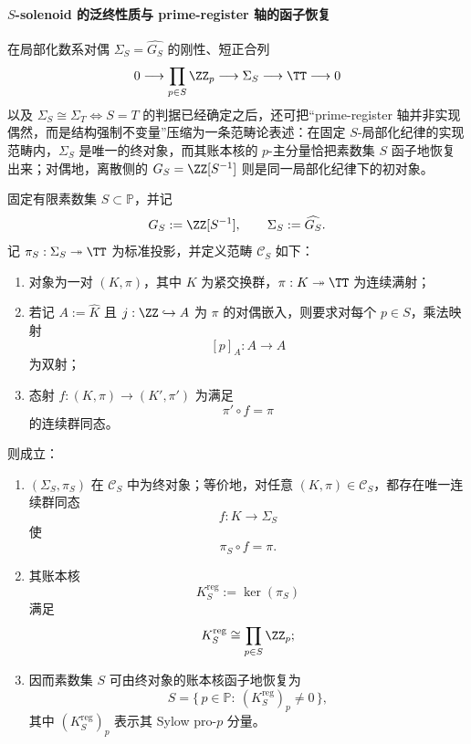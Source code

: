 \paragraph{\texorpdfstring{$S$}{S}-solenoid 的泛终性质与 prime-register 轴的函子恢复}
在局部化数系对偶 \(\Sigma_S=\widehat{G_S}\) 的刚性、短正合列
\[
0\longrightarrow \prod_{p\in S}\ZZ_p\longrightarrow \Sigma_S\longrightarrow \TT\longrightarrow 0
\]
以及 \(\Sigma_S\cong \Sigma_T\iff S=T\) 的判据已经确定之后，还可把“prime-register 轴并非实现偶然，而是结构强制不变量”压缩为一条范畴论表述：在固定 \(S\)-局部化纪律的实现范畴内，\(\Sigma_S\) 是唯一的终对象，而其账本核的 \(p\)-主分量恰把素数集 \(S\) 函子地恢复出来；对偶地，离散侧的 \(G_S=\ZZ[S^{-1}]\) 则是同一局部化纪律下的初对象。

\begin{theorem}\label{thm:xi-time-part56-solenoid-terminal-prime-register-recovery}
固定有限素数集 \(S\subset\mathbb P\)，并记
\[
G_S:=\ZZ[S^{-1}],
\qquad
\Sigma_S:=\widehat{G_S}.
\]
记 \(\pi_S:\Sigma_S\twoheadrightarrow\TT\) 为标准投影，并定义范畴 \(\mathcal C_S\) 如下：
\begin{enumerate}
  \item 对象为一对 \((K,\pi)\)，其中 \(K\) 为紧交换群，\(\pi:K\twoheadrightarrow\TT\) 为连续满射；
  \item 若记 \(A:=\widehat K\) 且 \(j:\ZZ\hookrightarrow A\) 为 \(\pi\) 的对偶嵌入，则要求对每个 \(p\in S\)，乘法映射
  \[
  [p]_A:A\longrightarrow A
  \]
  为双射；
  \item 态射 \(f:(K,\pi)\to(K',\pi')\) 为满足
  \[
  \pi' \circ f=\pi
  \]
  的连续群同态。
\end{enumerate}
则成立：
\begin{enumerate}
  \item \((\Sigma_S,\pi_S)\) 在 \(\mathcal C_S\) 中为终对象；等价地，对任意 \((K,\pi)\in\mathcal C_S\)，都存在唯一连续群同态
  \[
  f:K\longrightarrow \Sigma_S
  \]
  使
  \[
  \pi_S\circ f=\pi.
  \]
  \item 其账本核
  \[
  K_S^{\mathrm{reg}}:=\ker(\pi_S)
  \]
  满足
  \[
  K_S^{\mathrm{reg}}\cong \prod_{p\in S}\ZZ_p;
  \]
  \item 因而素数集 \(S\) 可由终对象的账本核函子地恢复为
  \[
  \boxed{\;
  S=\{\,p\in\mathbb P:\ (K_S^{\mathrm{reg}})_p\neq 0\,\},\;}
  \]
  其中 \((K_S^{\mathrm{reg}})_p\) 表示其 Sylow pro-\(p\) 分量。
\end{enumerate}
\end{theorem}

